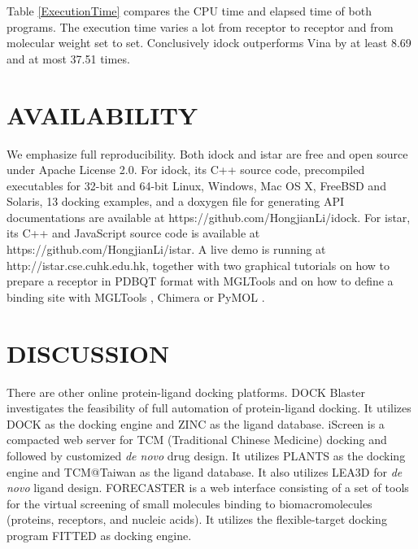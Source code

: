 \documentclass[12pt]{article}
\begin{document}
Table \ref{ExecutionTime} compares the CPU time and elapsed time of both programs. The execution time varies a lot from receptor to receptor and from molecular weight set to set. Conclusively idock outperforms Vina by at least 8.69 and at most 37.51 times.

\section*{\sffamily \Large AVAILABILITY}

We emphasize full reproducibility. Both idock and istar are free and open source under Apache License 2.0. For idock, its C++ source code, precompiled executables for 32-bit and 64-bit Linux, Windows, Mac OS X, FreeBSD and Solaris, 13 docking examples, and a doxygen file for generating API documentations are available at https://github.com/HongjianLi/idock. For istar, its C++ and JavaScript source code is available at https://github.com/HongjianLi/istar. A live demo is running at http://istar.cse.cuhk.edu.hk, together with two graphical tutorials on how to prepare a receptor in PDBQT format with MGLTools \citep{596} and on how to define a binding site with MGLTools \citep{596}, Chimera \citep{1219} or PyMOL \citep{1221}.

\section*{\sffamily \Large DISCUSSION}

There are other online protein-ligand docking platforms. DOCK Blaster \citep{557} investigates the feasibility of full automation of protein-ligand docking. It utilizes DOCK \citep{1222} as the docking engine and ZINC \citep{532,1178} as the ligand database. iScreen \citep{899} is a compacted web server for TCM (Traditional Chinese Medicine) docking and followed by customized \textit{de novo} drug design. It utilizes PLANTS \citep{610,607,779} as the docking engine and TCM@Taiwan \citep{528} as the ligand database. It also utilizes LEA3D \citep{1223} for \textit{de novo} ligand design. FORECASTER \citep{1012} is a web interface consisting of a set of tools for the virtual screening of small molecules binding to biomacromolecules (proteins, receptors, and nucleic acids). It utilizes the flexible-target docking program FITTED \citep{602} as docking engine.
\end{document}
